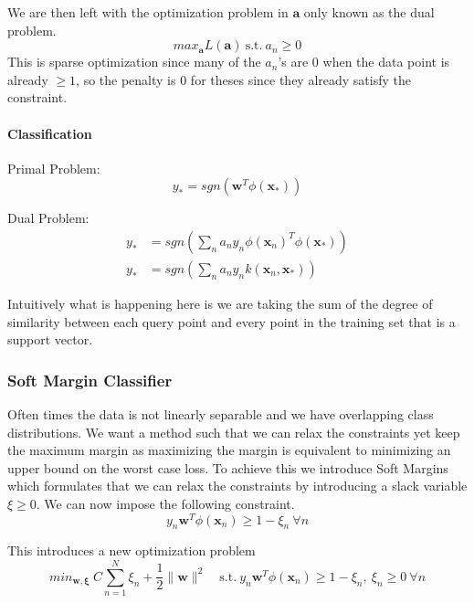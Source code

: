 \documentclass[12pt]{article}
\begin{document}
                We are then left with the optimization problem in $\boldsymbol{a}$ only known as the dual problem.
                $$ max_{\boldsymbol{a}}L(\boldsymbol{a}) \ \text{s.t.} \ a_n \geq 0 $$
                This is sparse optimization since many of the $a_n$'s are 0 when the data point is already $\geq 1$,
                so the penalty is 0 for theses since they already satisfy the constraint.
                
            \paragraph{Classification}
                Primal Problem:
                $$ y_* = sgn(\boldsymbol{w}^T\phi(\boldsymbol{x}_*)) $$

                Dual Problem:
                \begin{align*}
                y_* &= sgn(\sum_n a_ny_n\phi(\boldsymbol{x}_n)^T\phi(\boldsymbol{x}_*)) \\
                y_* &= sgn(\sum_n a_ny_n k(\boldsymbol{x}_n, \boldsymbol{x}_*))
                \end{align*}
                
                Intuitively what is happening here is we are taking the sum of the degree of similarity between each
                query point and every point in the training set that is a support vector.
            
        \subsubsection{Soft Margin Classifier}
            Often times the data is not linearly separable and we have overlapping class distributions. We want a method
            such that we can relax the constraints yet keep the maximum margin as maximizing the margin is equivalent to
            minimizing an upper bound on the worst case loss. To achieve this we introduce Soft Margins which formulates
            that we can relax the constraints by introducing a slack variable $\xi \geq 0$. We can now impose the
            following constraint.
            $$ y_n \boldsymbol{w}^T\phi(\boldsymbol{x}_n) \geq 1 - \xi_n \ \forall n $$

            This introduces a new optimization problem
            $$ min_{\boldsymbol{w}, \boldsymbol{\xi}} \ C \sum_{n=1}^N \xi_n + \frac{1}{2} \| \boldsymbol{w} \|^2
            \quad \textrm{s.t.} \ y_n \boldsymbol{w}^T \phi(\boldsymbol{x}_n) \geq 1 - \xi_n, \ \xi_n \geq 0 \ \forall n
            $$
            
\end{document}

